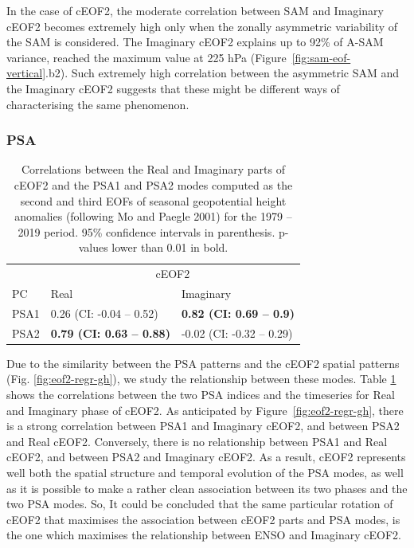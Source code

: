 \documentclass[smallextended]{svjour3}       %
\begin{document}
In the case of cEOF2, the moderate correlation between SAM and Imaginary cEOF2 becomes extremely high only when the zonally asymmetric variability of the SAM is considered.
The Imaginary cEOF2 explains up to 92\% of A-SAM variance, reached the maximum value at 225 hPa (Figure~\ref{fig:sam-eof-vertical}.b2).
Such extremely high correlation between the asymmetric SAM and the Imaginary cEOF2 suggests that these might be different ways of characterising the same phenomenon.

\hypertarget{psa}{%
\subsubsection{PSA}\label{psa}}



\begin{table}

\caption{\label{tab:psa-eof2}Correlations between the Real and Imaginary parts of cEOF2 and the PSA1 and PSA2 modes computed as the second and third EOFs of seasonal geopotential height anomalies (following Mo and Paegle 2001) for the 1979 -- 2019 period. 95\% confidence intervals in parenthesis. p-values lower than 0.01 in bold.}
\centering
\begin{tabular}[t]{l>{}l>{}l}
\toprule
\multicolumn{1}{c}{} & \multicolumn{2}{c}{cEOF2} \\
\cmidrule(l{3pt}r{3pt}){2-3}
PC & Real & Imaginary\\
\midrule
PSA1 & 0.26 (CI: -0.04 -- 0.52) & \textbf{0.82 (CI: 0.69 -- 0.9)}\\
PSA2 & \textbf{0.79 (CI: 0.63 -- 0.88)} & -0.02 (CI: -0.32 -- 0.29)\\
\bottomrule
\end{tabular}
\end{table}

Due to the similarity between the PSA patterns and the cEOF2 spatial patterns (Fig. \ref{fig:eof2-regr-gh}), we study the relationship between these modes.
Table \ref{tab:psa-eof2} shows the correlations between the two PSA indices and the timeseries for Real and Imaginary phase of cEOF2.
As anticipated by Figure~\ref{fig:eof2-regr-gh}, there is a strong correlation between PSA1 and Imaginary cEOF2, and between PSA2 and Real cEOF2.
Conversely, there is no relationship between PSA1 and Real cEOF2, and between PSA2 and Imaginary cEOF2.
As a result, cEOF2 represents well both the spatial structure and temporal evolution of the PSA modes, as well as it is possible to make a rather clean association between its two phases and the two PSA modes.
So, It could be concluded that the same particular rotation of cEOF2 that maximises the association between cEOF2 parts and PSA modes, is the one which maximises the relationship between ENSO and Imaginary cEOF2.
\end{document}
